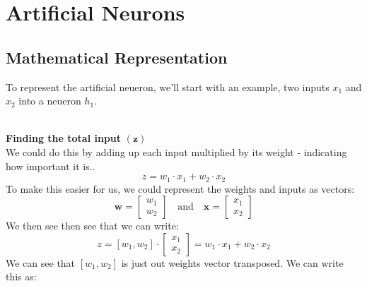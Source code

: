 \documentclass[9pt]{extarticle}
\theoremstyle{plain}
\theoremstyle{definition}
\theoremstyle{remark}
\begin{document}
\pagebreak

\section{Artificial Neurons}

\subsection{Mathematical Representation}
To represent the artificial neueron, we'll start with an example, two inputs $x_1$ and $x_2$ into a neueron $h_1$.
\begin{figure}[h]
    \centering
\end{figure} \\
\textbf{Finding the total input} $\mathbf{(z)}$\\[2ex]
We could do this by adding up each input multiplied by its weight - indicating how important it is..
$$z = w_1 \cdot x_1 + w_2 \cdot x_2$$
To make this easier for us, we could represent the weights and inputs as vectors:
$$\mathbf{w} = \begin{bmatrix} w_1 \\ w_2 \end{bmatrix} \quad \text{and} \quad \mathbf{x} = \begin{bmatrix} x_1 \\ x_2 \end{bmatrix}$$
We then see then see that we can write:
$$z = [w_1, w_2] \cdot \begin{bmatrix} x_1 \\ x_2 \end{bmatrix} = w_1 \cdot x_1 + w_2 \cdot x_2$$
We can see that $[w_1, w_2]$ is just out weights vector transposed. We can write this as:
\end{document}
